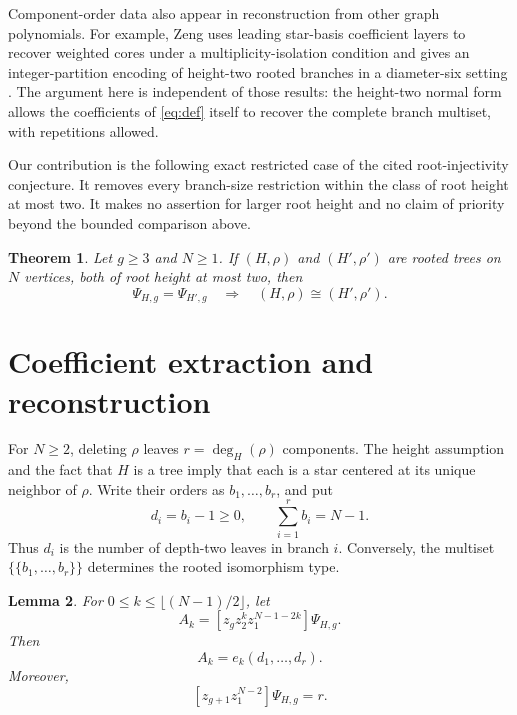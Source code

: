 \documentclass[11pt]{article}
\newtheorem{theorem}{Theorem}
\newtheorem{lemma}[theorem]{Lemma}
\newcommand{\PsiHG}{\Psi_{H,g}}
\newcommand{\coeff}[2]{[#1]#2}
\begin{document}
Component-order data also appear in reconstruction from other graph
polynomials.  For example, Zeng uses leading star-basis coefficient layers
to recover weighted cores under a multiplicity-isolation condition and
gives an integer-partition encoding of height-two rooted branches in a
diameter-six setting \cite[Sections~2--4]{Zeng2026Multiplicity}.  The
argument here is independent of those results: the height-two normal form
allows the coefficients of \eqref{eq:def} itself to recover the complete
branch multiset, with repetitions allowed.

Our contribution is the following exact restricted case of the cited
root-injectivity conjecture.  It removes every branch-size restriction
within the class of root height at most two.  It makes no assertion for
larger root height and no claim of priority beyond the bounded comparison
above.

\begin{theorem}\label{thm:main}
Let $g\geq3$ and $N\geq1$.  If $(H,\rho)$ and $(H',\rho')$ are rooted
trees on $N$ vertices, both of root height at most two, then
\[
 \Psi_{H,g}=\Psi_{H',g}
 \quad\Longrightarrow\quad
 (H,\rho)\cong(H',\rho').
\]
\end{theorem}

\section{Coefficient extraction and reconstruction}

For $N\geq2$, deleting $\rho$ leaves $r=\deg_H(\rho)$ components.
The height assumption and the fact that $H$ is a tree imply that each is
a star centered at its unique neighbor of $\rho$.  Write their orders as
$b_1,\ldots,b_r$, and put
\begin{equation}\label{eq:normal}
 d_i=b_i-1\geq0,
 \qquad \sum_{i=1}^r b_i=N-1.
\end{equation}
Thus $d_i$ is the number of depth-two leaves in branch $i$.  Conversely,
the multiset $\{\!\{b_1,\ldots,b_r\}\!\}$ determines the rooted
isomorphism type.

\begin{lemma}\label{lem:coefficients}
For $0\leq k\leq\lfloor(N-1)/2\rfloor$, let
\[
 A_k=\coeff{z_gz_2^kz_1^{N-1-2k}}{\PsiHG}.
\]
Then
\begin{equation}\label{eq:Ak}
 A_k=e_k(d_1,\ldots,d_r).
\end{equation}
Moreover,
\begin{equation}\label{eq:B}
 \coeff{z_{g+1}z_1^{N-2}}{\PsiHG}=r.
\end{equation}
\end{lemma}
\end{document}

